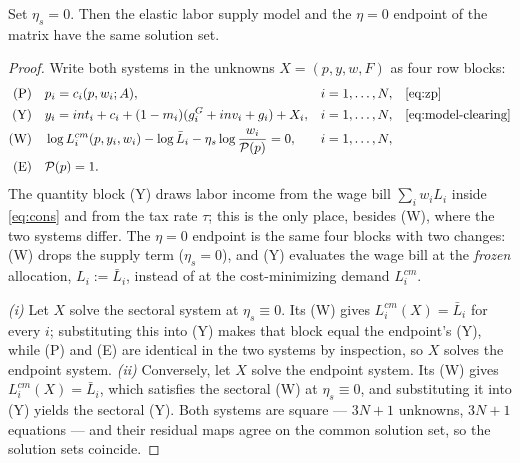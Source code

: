 \begin{proposition}[The rigid corner is the $\eta = 0$ endpoint]\label{prop:nest}
Set $\eta_s = 0$. Then the elastic labor supply model and the $\eta = 0$
endpoint of the matrix have the same solution set.
\end{proposition}

\begin{proof}
Write both systems in the unknowns $X = (p, y, w, F)$ as four row blocks:
\begin{align*}
\text{(P)} \quad & p_i = c_i(p, w_i; A), & & i = 1,\dots,N,
   & & \text{\eqref{eq:zp}} \\
\text{(Y)} \quad & y_i = int_i + c_i + (1-m_i)(g^G_i + inv_i + g_i) + X_i,
   & & i = 1,\dots,N, & & \text{\eqref{eq:model-clearing}} \\
\text{(W)} \quad & \log L^{cm}_i(p,y_i,w_i) - \log \bar{L}_i
   - \eta_s \log \frac{w_i}{\mathcal{P}(p)} = 0, & & i = 1,\dots,N, & & \\
\text{(E)} \quad & \mathcal{P}(p) = 1. & & & &
\end{align*}
The quantity block (Y) draws labor income from the wage bill
$\sum_i w_i L_i$ inside \eqref{eq:cons} and from the tax rate $\tau$; this is
the only place, besides (W), where the two systems differ. The $\eta = 0$
endpoint is the same four blocks with two changes: (W) drops the supply term
($\eta_s = 0$), and (Y) evaluates the wage bill at the \emph{frozen}
allocation, $L_i := \bar{L}_i$, instead of at the cost-minimizing demand
$L^{cm}_i$.

\emph{(i)} Let $X$ solve the sectoral system at $\eta_s \equiv 0$. Its (W)
gives $L^{cm}_i(X) = \bar{L}_i$ for every $i$; substituting this into (Y) makes
that block equal the endpoint's (Y), while (P) and (E) are identical in the two
systems by inspection, so $X$ solves the endpoint system.
\emph{(ii)} Conversely, let $X$ solve the endpoint system. Its (W) gives
$L^{cm}_i(X) = \bar{L}_i$, which satisfies the sectoral (W) at
$\eta_s \equiv 0$, and substituting it into (Y) yields the sectoral (Y).
Both systems are square --- $3N+1$ unknowns, $3N+1$ equations --- and their
residual maps agree on the common solution set, so the solution sets coincide.
\end{proof}


